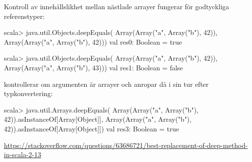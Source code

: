 \begin{Slide}{Kontroll av innehållslikhet mellan nästlade arrayer}\SlideFontTiny
{} fungerar  för godtyckliga referenstyper:
\begin{REPLsmall}
scala> java.util.Objects.deepEquals(
          Array(Array("a", Array("b"), 42)),
          Array(Array("a", Array("b"), 42)))
val res0: Boolean = true

scala> java.util.Objects.deepEquals(
          Array(Array("a", Array("b"), 42)),
          Array(Array("a", Array("b"), 43)))
val res1: Boolean = false
\end{REPLsmall}
 kontrollerar om argumenten är arrayer och anropar då i sin tur  efter typkonvertering:
\begin{REPLsmall}
scala> java.util.Arrays.deepEquals(
          Array(Array("a", Array("b"), 42)).asInstanceOf[Array[Object]],
          Array(Array("a", Array("b"), 42)).asInstanceOf[Array[Object]])
val res3: Boolean = true

\end{REPLsmall}
\url{https://stackoverflow.com/questions/63686721/best-replacement-of-deep-method-in-scala-2-13}
\end{Slide}




